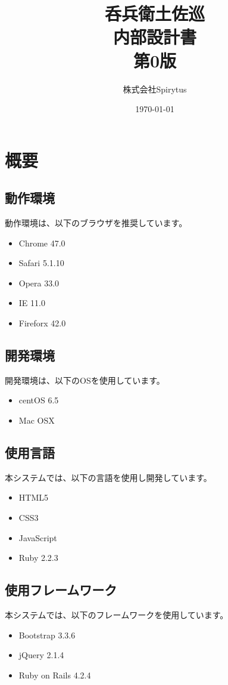 \documentclass[a4j,titlepage]{jarticle}
\title{呑兵衛土佐巡\\
内部設計書\\
第0版}
\author{株式会社Spirytus}
\date{\today}
\begin{document}
\maketitle
\tableofcontents

\clearpage

\section{概要}
\subsection{動作環境}
動作環境は、以下のブラウザを推奨しています。
\begin{itemize}
\item Chrome 47.0
\item Safari 5.1.10
\item Opera 33.0
\item IE 11.0
\item Fireforx 42.0
\end{itemize}

\subsection{開発環境}
開発環境は、以下のOSを使用しています。
\begin{itemize}
\item centOS 6.5
\item Mac OSX
\end{itemize}

\subsection{使用言語}
本システムでは、以下の言語を使用し開発しています。
\begin{itemize}
\item HTML5
\item CSS3
\item JavaScript
\item Ruby 2.2.3
\end{itemize}

\subsection{使用フレームワーク}
本システムでは、以下のフレームワークを使用しています。
\begin{itemize}
\item Bootstrap 3.3.6
\item jQuery 2.1.4
\item Ruby on Rails 4.2.4
\end{itemize}
\end{document}
